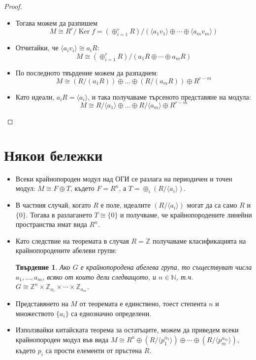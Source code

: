 \documentclass{article}
\newif\ifusemulticols
\theoremstyle{definition}
\theoremstyle{remark}
\theoremstyle{plain}
\theoremstyle{plain}
\newtheorem{prop}[theorem]{Твърдение}
\newenvironment{mymulticols}
    { \ifusemulticols \begin{multicols}{2} \fi }
    { \ifusemulticols \end{multicols} \fi }
\DeclareMathOperator{\Ker}{Ker}
\newcommand{\N}{\mathbb{N}}
\newcommand{\Z}{\mathbb{Z}}
\begin{document}
\begin{mymulticols}
\begin{proof}
\begin{itemize}
        \item Тогава можем да разпишем $$M\cong R^r/\Ker f = (\oplus_{i=1}^r R)/(\langle
            a_1 v_1 \rangle \oplus \cdots \oplus \langle a_m v_m \rangle) $$

        \item Отчитайки, че $\langle a_iv_i \rangle \cong a_iR$:
            $$M \cong (\oplus_{i=1}^r R)/(a_1R\oplus\cdots\oplus a_mR)$$

        \item По последното твърдение можем да разпаднем: $$M \cong
            \left(R/(a_1R)\right)\oplus\ldots\oplus\left(R/(a_mR)\right)\oplus R^{r-m}$$

        \item Като идеали, $a_iR = \langle a_i \rangle$, и така получаваме търсеното
            представяне на модула:
            $$M \cong R/\langle a_1 \rangle \oplus \ldots \oplus
            R/\langle a_m \rangle \oplus R^{r-m}$$
    \end{itemize}
\end{proof}

\section{Някои бележки}%

\begin{itemize}
    \item Всеки крайнопороден модул над ОГИ се разлага на периодичен и точен модул: $M \cong F
        \oplus T$, където $F = R^n$, а $T = \oplus_i (R/\langle a_i \rangle)$.
    \item В частния случай, когато $R$ е поле, идеалите $(R/\langle a_i \rangle)$ могат да са само
        $R$ и $\{0\}$. Тогава в разлагането $T \cong \{ 0 \}$ и получваме, че крайнопородените
        линейни пространства имат вида $R^n$.
    \item Като следствие на теоремата в случая $R = \Z$ получаваме класификацията на
        крайнопородените абелеви групи:
        \begin{prop}
            Ако $G$ е крайнопородена абелева група, то съществуват числа $a_1,\ldots,a_m$, всяко от които
            дели следващото, и $n \in \N$, т.ч. $G \cong \Z^n \times \Z_{a_1} \times \cdots \times
            \Z_{a_m}$.
        \end{prop}
    \item Представянето на $M$ от теоремата е единствено, тоест степента $n$ и множеството $\{ a_i
        \}$ са еднозначно определени.
    \item Използвайки китайската теорема за остатъците, можем да приведем всеки крайнопороден модул
        във вида $M \cong R^n \oplus (R/{\langle p_1^{\alpha_1} \rangle}) \oplus \cdots \oplus
        (R/{\langle p_m^{\alpha_m}} \rangle)$, където $p_i$ са прости елементи от пръстена $R$.
\end{itemize}


\end{mymulticols}
\end{document}
